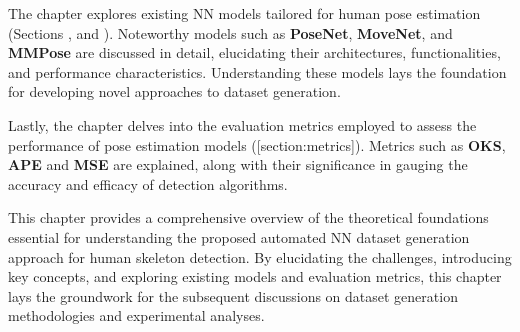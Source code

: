 
The chapter explores existing NN models tailored for human pose estimation (Sections ,  and ). Noteworthy models such as {\bf PoseNet}, {\bf MoveNet}, and {\bf MMPose} are discussed in detail, elucidating their architectures, functionalities, and performance characteristics. Understanding these models lays the foundation for developing novel approaches to dataset generation.


Lastly, the chapter delves into the evaluation metrics employed to assess the performance of pose estimation models ([section:metrics]). Metrics such as {\bf OKS}, {\bf APE} and {\bf MSE} are explained, along with their significance in gauging the accuracy and efficacy of detection algorithms.

This chapter provides a comprehensive overview of the theoretical foundations essential for understanding the proposed automated NN dataset generation approach for human skeleton detection. By elucidating the challenges, introducing key concepts, and exploring existing models and evaluation metrics, this chapter lays the groundwork for the subsequent discussions on dataset generation methodologies and experimental analyses.